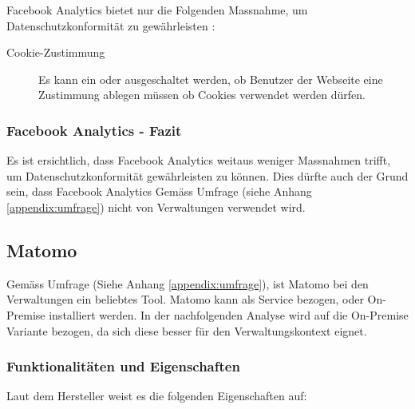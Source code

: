 Facebook Analytics bietet nur die Folgenden Massnahme, um Datenschutzkonformität zu gewährleisten \parencite{facebookAnalyticsGDPR}: 

\begin{description}
  \item[Cookie-Zustimmung] Es kann ein oder ausgeschaltet werden, ob Benutzer der Webseite eine Zustimmung ablegen müssen ob Cookies verwendet werden dürfen.
\end{description}

\subsubsection{Facebook Analytics - Fazit}
Es ist ersichtlich, dass Facebook Analytics weitaus weniger Massnahmen trifft, um Datenschutzkonformität gewährleisten zu können. Dies dürfte auch der Grund sein, dass Facebook Analytics Gemäss Umfrage (siehe Anhang \ref{appendix:umfrage}) nicht von Verwaltungen verwendet wird.

\subsection{Matomo}

Gemäss Umfrage (Siehe Anhang \ref{appendix:umfrage}), ist Matomo bei den Verwaltungen ein beliebtes Tool. Matomo kann als Service bezogen, oder On-Premise installiert werden. In der nachfolgenden Analyse wird auf die On-Premise Variante bezogen, da sich diese besser für den Verwaltungskontext eignet.  

\subsubsection{Funktionalitäten und Eigenschaften}
Laut dem Hersteller weist es die folgenden Eigenschaften auf:

